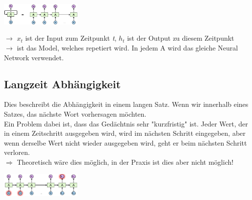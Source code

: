 \documentclass{article}
\newenvironment{Figure}
	{\par\medskip\noindent\minipage{\linewidth}}
	{\endminipage\par\medskip}
\theoremstyle{merke}
\theoremstyle{definition}
\begin{document}
        \begin{Figure}
        \centering
        \includegraphics[width=150px]{img/RNNStructure.png}
            \label{fig:Abbildung der Struktur eines RNNs}
        \end{Figure}
        $\rightarrow$ \textbf{$x_t$} ist der Input zum Zeitpunkt \textit{t}, \textbf{$h_t$} ist der Output zu diesem Zeitpunkt\\
        $\rightarrow$ ist das Model, welches repetiert wird. In jedem A wird das gleiche Neural Network verwendet.
        
        \subsection{Langzeit Abhängigkeit}
        Dies beschreibt die Abhängigkeit in einem langen Satz. Wenn wir innerhalb eines Satzes, das nächste Wort vorhersagen möchten.\\
        Ein Problem dabei ist, dass das Gedächtnis sehr "kurzfristig" ist. Jeder Wert, der in einem Zeitschritt ausgegeben wird, wird im nächsten Schritt eingegeben, aber wenn derselbe Wert nicht wieder ausgegeben wird, geht er beim nächsten Schritt verloren.\\
        $\Rightarrow$ Theoretisch wäre dies möglich, in der Praxis ist dies aber nicht möglich!
        
        \begin{Figure}
        \centering
        \includegraphics[width=150px]{img/RNNLongTerm.png}
            \label{fig:Abbildung der Struktur eines longterm RNNs}
        \end{Figure}
\end{document}

